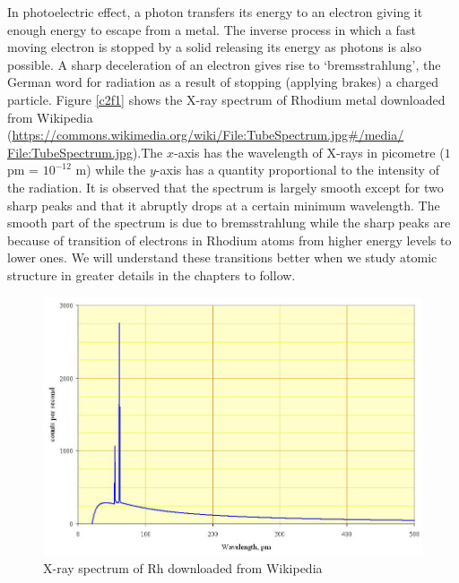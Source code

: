 In photoelectric effect, a photon transfers its energy to an electron giving it
enough energy to escape from a metal. The inverse process in which a fast moving
electron is stopped by a solid releasing its energy as photons is also possible.
A sharp deceleration of an electron gives rise to `bremsstrahlung', the German
word for radiation as a result of stopping (applying brakes) a charged particle.
Figure \ref{c2f1} shows the X-ray spectrum of Rhodium metal downloaded from
Wikipedia (\url{https://commons.wikimedia.org/wiki/File:TubeSpectrum.jpg#/media/
File:TubeSpectrum.jpg}).The $x$-axis has the wavelength of X-rays in picometre
($1$ pm = $10^{-12}$ m) while the $y$-axis has a quantity proportional to the
intensity of the radiation. It is observed that the spectrum is largely smooth
except for two sharp peaks and that it abruptly drops at a certain minimum
wavelength. The smooth part of the spectrum is due to bremsstrahlung while the
sharp peaks are because of transition of electrons in Rhodium atoms from higher 
energy levels to lower ones. We will understand these transitions better when we
study atomic structure in greater details in the chapters to follow.
\begin{figure}
\includegraphics[scale=0.5]{Tubespectrum}
\caption{X-ray spectrum of Rh downloaded from Wikipedia}\label{c2f2}
\end{figure}

